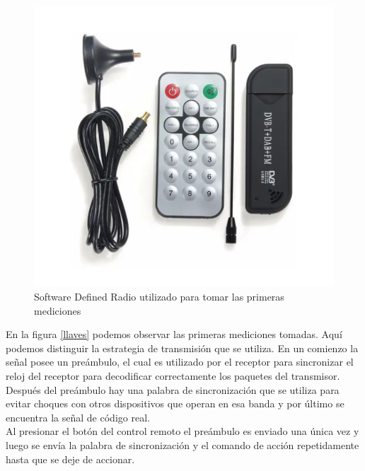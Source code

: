 \documentclass[12pt]{report}
\begin{document}
\begin{figure}[htb]
	\centering
	\includegraphics[scale=0.4]{sdr.png}
	\caption{Software Defined Radio utilizado para tomar las primeras mediciones}
	\label{SDR}
\end{figure}

En la figura \ref{llaves} podemos observar las primeras mediciones tomadas. Aquí podemos distinguir la estrategia de transmisión que se
utiliza. En un comienzo la señal posee un preámbulo, el cual es utilizado por el receptor para sincronizar el reloj del receptor  para 
decodificar correctamente los paquetes del transmisor. Después del preámbulo hay una palabra de sincronización que se utiliza para evitar 
choques con otros dispositivos que operan en esa banda y por último se encuentra la señal de código real.\\
Al presionar el botón del control remoto el preámbulo es enviado una única vez y luego se envía la palabra de sincronización y el
comando de acción repetidamente hasta que se deje de accionar.
\end{document}
